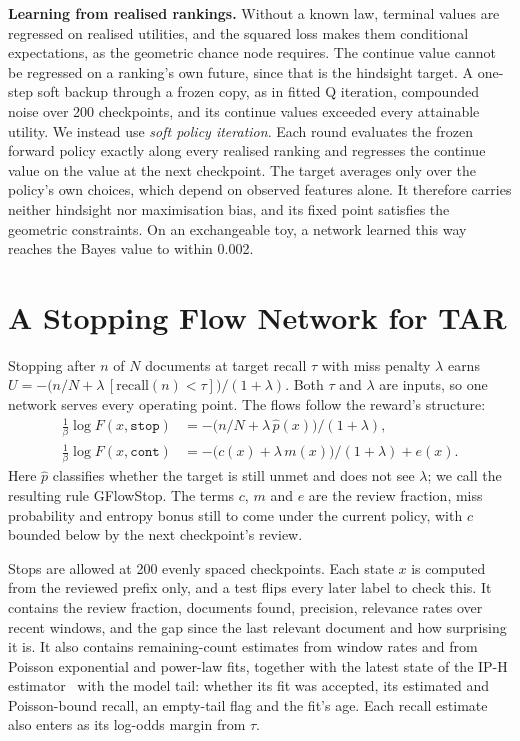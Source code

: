 \documentclass[sigconf,review,anonymous]{acmart}
\begin{document}
\textbf{Learning from realised rankings.} Without a known law, terminal values are regressed on realised utilities, and the squared loss makes them conditional expectations, as the geometric chance node requires. The continue value cannot be regressed on a ranking's own future, since that is the hindsight target. A one-step soft backup through a frozen copy, as in fitted Q iteration, compounded noise over 200 checkpoints, and its continue values exceeded every attainable utility. We instead use \emph{soft policy iteration}. Each round evaluates the frozen forward policy exactly along every realised ranking and regresses the continue value on the value at the next checkpoint. The target averages only over the policy's own choices, which depend on observed features alone. It therefore carries neither hindsight nor maximisation bias, and its fixed point satisfies the geometric constraints. On an exchangeable toy, a network learned this way reaches the Bayes value to within 0.002.

\section{A Stopping Flow Network for TAR}

Stopping after $n$ of $N$ documents at target recall $\tau$ with miss penalty $\lambda$ earns $U=-\big(n/N+\lambda\,[\mathrm{recall}(n)<\tau]\big)/(1+\lambda)$. Both $\tau$ and $\lambda$ are inputs, so one network serves every operating point. The flows follow the reward's structure:
\begin{align*}
\tfrac{1}{\beta}\log F(x,\texttt{stop}) &= -\big(n/N+\lambda\,\hat p(x)\big)/(1+\lambda),\\
\tfrac{1}{\beta}\log F(x,\texttt{cont}) &= -\big(c(x)+\lambda\,m(x)\big)/(1+\lambda)+e(x).
\end{align*}
Here $\hat p$ classifies whether the target is still unmet and does not see $\lambda$; we call the resulting rule GFlowStop. The terms $c$, $m$ and $e$ are the review fraction, miss probability and entropy bonus still to come under the current policy, with $c$ bounded below by the next checkpoint's review.

Stops are allowed at 200 evenly spaced checkpoints. Each state $x$ is computed from the reviewed prefix only, and a test flips every later label to check this. It contains the review fraction, documents found, precision, relevance rates over recent windows, and the gap since the last relevant document and how surprising it is. It also contains remaining-count estimates from window rates and from Poisson exponential and power-law fits, together with the latest state of the IP-H estimator~\cite{stevenson2023point} with the model tail: whether its fit was accepted, its estimated and Poisson-bound recall, an empty-tail flag and the fit's age. Each recall estimate also enters as its log-odds margin from $\tau$.
\end{document}
